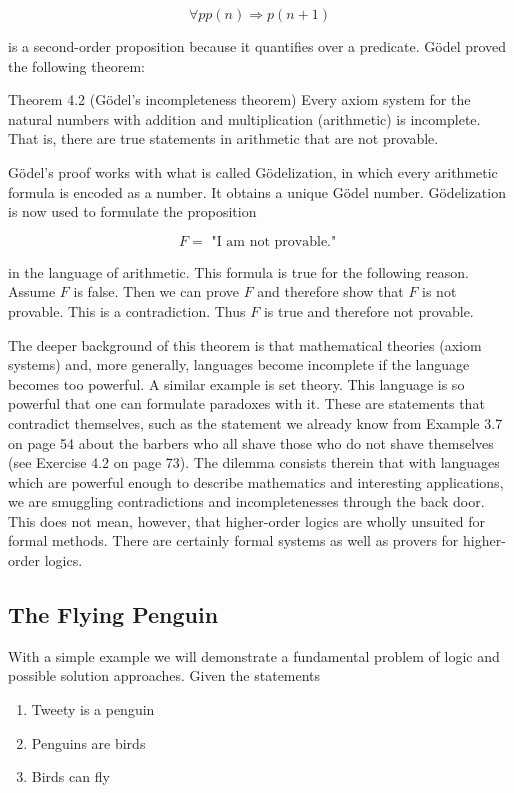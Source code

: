 \documentclass[10pt]{article}
\begin{document}
$$
\forall p p(n) \Rightarrow p(n+1)
$$

is a second-order proposition because it quantifies over a predicate. Gödel proved the following theorem:

\begin{displayquote}
Theorem 4.2 (Gödel's incompleteness theorem) Every axiom system for the natural numbers with addition and multiplication (arithmetic) is incomplete. That is, there are true statements in arithmetic that are not provable.
\end{displayquote}

Gödel's proof works with what is called Gödelization, in which every arithmetic formula is encoded as a number. It obtains a unique Gödel number. Gödelization is now used to formulate the proposition

$$
F=\text { "I am not provable." }
$$

in the language of arithmetic. This formula is true for the following reason. Assume $F$ is false. Then we can prove $F$ and therefore show that $F$ is not provable. This is a contradiction. Thus $F$ is true and therefore not provable.

The deeper background of this theorem is that mathematical theories (axiom systems) and, more generally, languages become incomplete if the language becomes too powerful. A similar example is set theory. This language is so powerful that one can formulate paradoxes with it. These are statements that contradict themselves, such as the statement we already know from Example 3.7 on page 54 about the barbers who all shave those who do not shave themselves (see Exercise 4.2 on page 73). The dilemma consists therein that with languages which are powerful enough to describe mathematics and interesting applications, we are smuggling contradictions and incompletenesses through the back door. This does not mean, however, that higher-order logics are wholly unsuited for formal methods. There are certainly formal systems as well as provers for higher-order logics.

\subsection*{The Flying Penguin}
With a simple example we will demonstrate a fundamental problem of logic and possible solution approaches. Given the statements

\begin{enumerate}
  \item Tweety is a penguin
  \item Penguins are birds
  \item Birds can fly
\end{enumerate}
\end{document}
